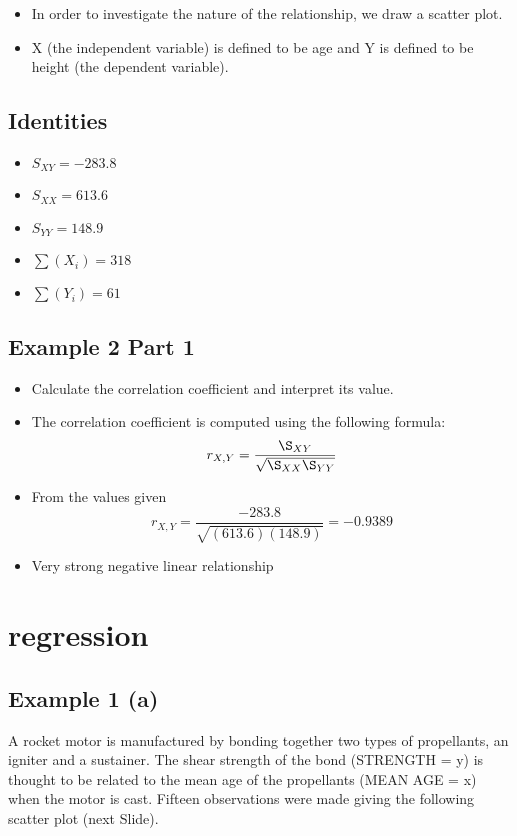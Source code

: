 \documentclass[]{report}
\begin{document}
\begin{itemize}
	\item In order to investigate the nature of the relationship, we draw a
	scatter plot.
	\item X (the independent variable) is defined to be age and Y is defined
	to be height (the dependent variable).
\end{itemize}



\subsection{Identities}
\begin{itemize}
	\item $S_{XY} = -283.8$
	\item $S_{XX} = 613.6$
	\item $S_{YY} = 148.9$
	\item $\sum(X_i)  = 318 $
	\item $\sum(Y_i)  = 61$
\end{itemize}



\subsection{Example 2 Part 1}

\begin{itemize}
	\item Calculate the correlation coefficient and interpret its value.
	\item The correlation coefficient is computed using the following formula:
	\[ r_{X,Y} = \frac{\S_{XY}}{\sqrt{\S_{XX}\S_{YY}}} \]
	\item From the values given
	\[ r_{X,Y} = \frac{-283.8}{\sqrt{(613.6)(148.9)}} = -0.9389 \]
	\item Very strong negative linear relationship
\end{itemize}

\section{regression}


\subsection{Example 1 (a)}
A rocket motor is manufactured by bonding together two types of
propellants, an igniter and a sustainer.
The shear strength of the bond (STRENGTH = y)
is thought to be related to the mean age of the propellants (MEAN AGE = x) when the motor is cast.
Fifteen observations were made giving the following scatter plot (next Slide).
\end{document}
